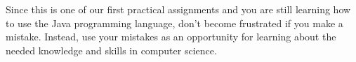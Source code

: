 Since this is one of our first practical assignments and you are still learning how to use the Java programming
language, don't become frustrated if you make a mistake. Instead, use your mistakes as an opportunity for learning about
the needed knowledge and skills in computer science.










